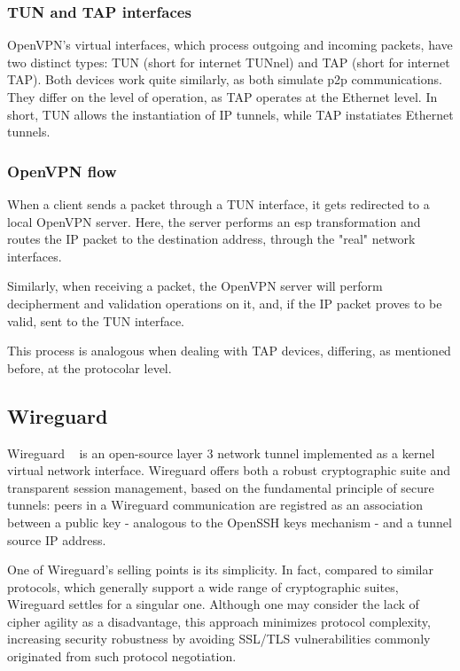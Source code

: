 \documentclass[11pt,twoside,a4paper]{report}
\begin{document}
\subsubsection{TUN and TAP interfaces}

OpenVPN's virtual interfaces, which process outgoing and incoming packets, have two distinct types: TUN (short for internet TUNnel) and TAP (short for internet TAP). Both devices work quite similarly, as both simulate \acrshort{p2p} communications. They differ on the level of operation, as TAP operates at the Ethernet level. In short, TUN allows the instantiation of IP tunnels, while TAP instatiates Ethernet tunnels.

\subsubsection{OpenVPN flow}

When a client sends a packet through a TUN interface, it gets redirected to a local OpenVPN server. Here, the server performs an \acrshort{esp} transformation and routes the IP packet to the destination address, through the "real" network interfaces.

Similarly, when receiving a packet, the OpenVPN server will perform decipherment and validation operations on it, and, if the IP packet proves to be valid, sent to the TUN interface.

This process is analogous when dealing with TAP devices, differing, as mentioned before, at the protocolar level.

\subsection{Wireguard}

Wireguard ~\cite{donenfeld2017wireguard} is an open-source layer 3 network tunnel implemented as a kernel virtual network interface. Wireguard offers both a robust cryptographic suite and transparent session management, based on the fundamental principle of secure tunnels: peers in a Wireguard communication are registred as an association between a public key - analogous to the OpenSSH keys mechanism - and a tunnel source IP address.

One of Wireguard's selling points is its simplicity. In fact, compared to similar protocols, which generally support a wide range of cryptographic suites, Wireguard settles for a singular one. Although one may consider the lack of cipher agility as a disadvantage, this approach minimizes protocol complexity, increasing security robustness by avoiding SSL/TLS vulnerabilities commonly originated from such protocol negotiation.
\end{document}
